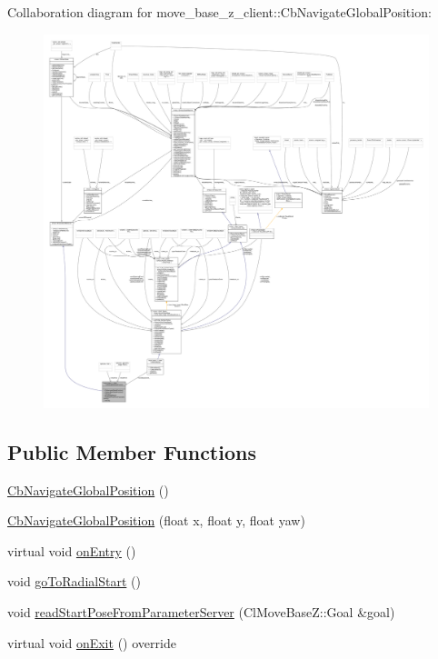 Collaboration diagram for move\+\_\+base\+\_\+z\+\_\+client\+:\+:Cb\+Navigate\+Global\+Position\+:\nopagebreak
\begin{figure}[H]
\begin{center}
\leavevmode
\includegraphics[width=350pt]{classmove__base__z__client_1_1CbNavigateGlobalPosition__coll__graph}
\end{center}
\end{figure}
\subsection*{Public Member Functions}
\begin{DoxyCompactItemize}
\item 
\hyperlink{classmove__base__z__client_1_1CbNavigateGlobalPosition_a3aec938912c0df9798bb18d5bb86c628}{Cb\+Navigate\+Global\+Position} ()
\item 
\hyperlink{classmove__base__z__client_1_1CbNavigateGlobalPosition_a4270b60a6d8ea39810ef1133f4e2cae4}{Cb\+Navigate\+Global\+Position} (float x, float y, float yaw)
\item 
virtual void \hyperlink{classmove__base__z__client_1_1CbNavigateGlobalPosition_a79f11334456f350b488f7d9a204ea3c5}{on\+Entry} ()
\item 
void \hyperlink{classmove__base__z__client_1_1CbNavigateGlobalPosition_abc8b9437cce7b86ec7acb07c463c90e5}{go\+To\+Radial\+Start} ()
\item 
void \hyperlink{classmove__base__z__client_1_1CbNavigateGlobalPosition_a866ea02c9e25ac1df9df88272deb04b3}{read\+Start\+Pose\+From\+Parameter\+Server} (Cl\+Move\+Base\+Z\+::\+Goal \&goal)
\item 
virtual void \hyperlink{classmove__base__z__client_1_1CbNavigateGlobalPosition_ac7994a9da6384c1b9ad3826bfebb5f56}{on\+Exit} () override
\end{DoxyCompactItemize}
